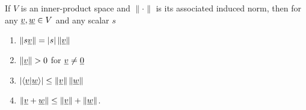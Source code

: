 \begin{theorem}
If $V$ is an inner-product space and $\| \cdot \|$ is its associated induced norm, then for any $\underline{v}, \underline{w} \in V$ and any scalar $s$
\begin{enumerate}
\item $\left\| s \underline{v} \right\| = |s| \left\| \underline{v} \right\|$
\item $\left\| \underline{v} \right\| > 0$ for $\underline{v} \neq \underline{0}$
\item $\left| \left\langle \underline{v} | \underline{w} \right\rangle \right| \leq \left\| \underline{v} \right\| \left\| \underline{w} \right\|$
\item $\left\| \underline{v} + \underline{w} \right\| \leq \left\| \underline{v} \right\| + \left\| \underline{w} \right\|$.
\end{enumerate}
\end{theorem}
